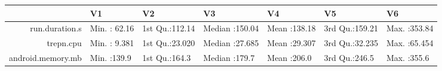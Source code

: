 \begin{table}[ht]
\centering
\begin{tabular}{rllllll}
  \hline
 & V1 & V2 & V3 & V4 & V5 & V6 \\ 
  \hline
run.duration.s & Min.   : 62.16   & 1st Qu.:112.14   & Median :150.04   & Mean   :138.18   & 3rd Qu.:159.21   & Max.   :353.84   \\ 
    trepn.cpu & Min.   : 9.381   & 1st Qu.:23.020   & Median :27.685   & Mean   :29.307   & 3rd Qu.:32.235   & Max.   :65.454   \\ 
  android.memory.mb & Min.   :139.9   & 1st Qu.:164.3   & Median :179.7   & Mean   :206.0   & 3rd Qu.:246.5   & Max.   :355.6   \\ 
   \hline
\end{tabular}
\end{table}
